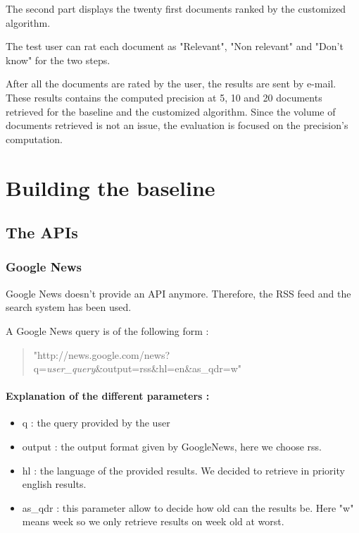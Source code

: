 \documentclass{acmsmall}
\begin{document}
The second part displays the twenty first documents ranked by the customized algorithm.

The test user can rat each document as "Relevant", "Non relevant" and "Don't know" for the two steps.

After all the documents are rated by the user, the results are sent by e-mail. These results contains the computed precision at 5, 10 and 20 documents retrieved for the baseline and the customized algorithm. Since the volume of documents retrieved is not an issue, the evaluation is focused on the precision's computation.  


\section{Building the baseline}

\subsection{The APIs}

\subsubsection{Google News}
Google News doesn't provide an API anymore. Therefore, the RSS feed and the search system has been used.

A Google News query is of the following form :

\begin{quote}
"http://news.google.com/news?q=\textit{user\_query}\&output=rss\&hl=en\&as\_qdr=w"
\end{quote}

\paragraph{Explanation of the different parameters : }
\begin{itemize}
	\item q : the query provided by the user
	\item output : the output format given by GoogleNews, here we choose rss.
	\item hl : the language of the provided results. We decided to retrieve in priority english results.
	\item as\_qdr : this parameter allow to decide how old can the results be. Here "w" means week so we only retrieve results on week old at worst.
\end{itemize}
\end{document}
